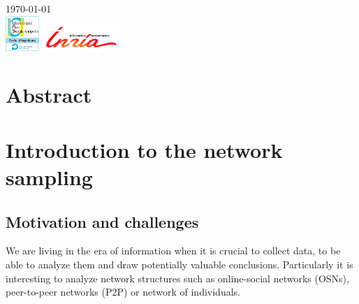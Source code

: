 \documentclass[12pt]{report}
\begin{document}
\begin{titlepage}

{\large \today}\\[1cm] %


\includegraphics[height=50px]{univer} \qquad\qquad
\includegraphics[height=40px]{inria}\\[1cm] 
 

\vfill %

\end{titlepage}

\chapter{Abstract}

\chapter{Introduction to the network sampling}

\section{Motivation and challenges}

We are living in the era of information when it is crucial to collect data, to be able to analyze them and draw potentially valuable conclusions. Particularly it is interesting to analyze network structures such as online-social networks (OSNs), peer-to-peer networks (P2P) or network of individuals.
\end{document}
